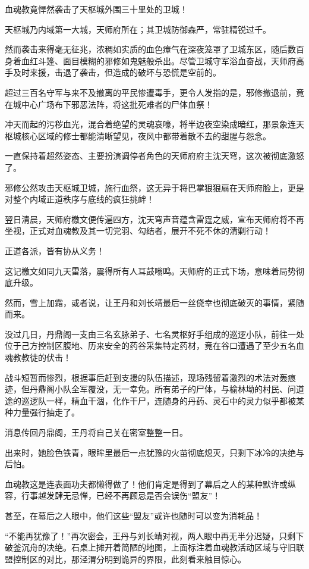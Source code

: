 血魂教竟悍然袭击了天枢城外围三十里处的卫城！

天枢城乃内域第一大城，天师府所在；其卫城防御森严，常驻精锐过千。

然而袭击来得毫无征兆，浓稠如实质的血色瘴气在深夜笼罩了卫城东区，随后数百身着血红斗篷、面目模糊的邪修如鬼魅般杀出。尽管卫城守军浴血奋战，天师府高手及时来援，击退了袭击，但造成的破坏与恐慌是空前的。

超过三百名守军与来不及撤离的平民惨遭毒手，更令人发指的是，邪修撤退前，竟在城中心广场布下邪恶法阵，将这批死难者的尸体血祭！

冲天而起的污秽血光，混合着绝望的灵魂哀嚎，将半边夜空染成暗红，那景象连天枢城核心区域的修士都能清晰望见，夜风中都带着散不去的甜腥与怨念。

一直保持着超然姿态、主要扮演调停者角色的天师府府主沈天穹，这次被彻底激怒了。

邪修公然攻击天枢城卫城，施行血祭，这无异于将巴掌狠狠扇在天师府脸上，更是对整个内域正道秩序与底线的疯狂挑衅！

翌日清晨，天师府檄文便传遍四方，沈天穹声音蕴含雷霆之威，宣布天师府将不再坐视，正式对血魂教及其一切党羽、勾结者，展开不死不休的清剿行动！

正道各派，皆有协从义务！

这记檄文如同九天雷落，震得所有人耳鼓嗡鸣。天师府的正式下场，意味着局势彻底升级。

\vspace{2em}

然而，雪上加霜，或者说，让王丹和刘长靖最后一丝侥幸也彻底破灭的事情，紧随而来。

没过几日，丹鼎阁一支由三名玄脉弟子、七名灵枢好手组成的巡逻小队，前往一处位于己方控制区腹地、历来安全的药谷采集特定药材，竟在谷口遭遇了至少五名血魂教教徒的伏击！

战斗短暂而惨烈，根据事后赶到支援的队伍描述，现场残留着激烈的术法对轰痕迹，但丹鼎阁小队全军覆没，无一幸免。所有弟子的尸体，与榆林坳的村民、问道途的巡逻队一样，精血干涸，化作干尸，连随身的丹药、灵石中的灵力似乎都被某种力量强行抽走了。

消息传回丹鼎阁，王丹将自己关在密室整整一日。

出来时，她脸色铁青，眼眸里最后一点犹豫的火苗彻底熄灭，只剩下冰冷的决绝与后怕。

血魂教这是连表面功夫都懒得做了！他们肯定是得到了幕后之人的某种默许或纵容，行事越发肆无忌惮，已经不再顾忌是否会误伤“盟友”！

甚至，在幕后之人眼中，他们这些“盟友”或许也随时可以变为消耗品！

“不能再犹豫了！”再次密会，王丹与刘长靖对视，两人眼中再无半分迟疑，只剩下破釜沉舟的决绝。石桌上摊开着简陋的地图，上面标注着血魂教活动区域与守旧联盟控制区的对比，那泾渭分明到诡异的界限，此刻看来触目惊心。

